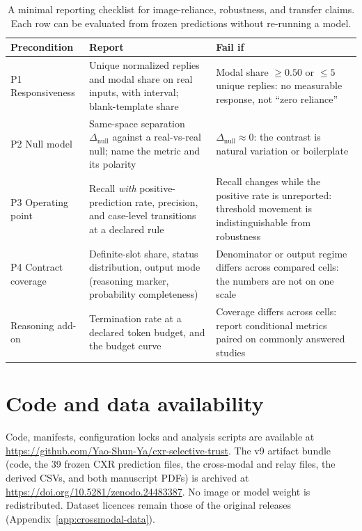 \begin{table}[h]
\centering
\small
\caption{A minimal reporting checklist for image-reliance, robustness, and transfer claims. Each row can be evaluated from frozen predictions without re-running a model.}
\label{tab:checklist}
\begin{tabular}{p{}p{}p{}}
\toprule
Precondition & Report & Fail if \\
\midrule
P1 Responsiveness & Unique normalized replies and modal share on real inputs, with interval; blank-template share & Modal share $\ge 0.50$ or $\le 5$ unique replies: no measurable response, not ``zero reliance'' \\
P2 Null model & Same-space separation $\Delta_{\text{null}}$ against a real-vs-real null; name the metric and its polarity & $\Delta_{\text{null}} \approx 0$: the contrast is natural variation or boilerplate \\
P3 Operating point & Recall \emph{with} positive-prediction rate, precision, and case-level transitions at a declared rule & Recall changes while the positive rate is unreported: threshold movement is indistinguishable from robustness \\
P4 Contract coverage & Definite-slot share, status distribution, output mode (reasoning marker, probability completeness) & Denominator or output regime differs across compared cells: the numbers are not on one scale \\
\midrule
Reasoning add-on & Termination rate at a declared token budget, and the budget curve & Coverage differs across cells: report conditional metrics paired on commonly answered studies \\
\bottomrule
\end{tabular}
\end{table}

\section*{Code and data availability}

Code, manifests, configuration locks and analysis scripts are available at
\url{https://github.com/Yao-Shun-Ya/cxr-selective-trust}. The v9 artifact bundle
(code, the 39 frozen CXR prediction files, the cross-modal and relay files, the
derived CSVs, and both manuscript PDFs) is archived at
\url{https://doi.org/10.5281/zenodo.24483387}. No image or model weight is
redistributed. Dataset licences remain those of the original releases
(Appendix~\ref{app:crossmodal-data}).

